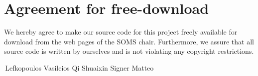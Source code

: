 \section*{Agreement for free-download}
\bigskip

\bigskip

\large We hereby agree to make our source code for this project freely available for download from the web pages of the SOMS chair. Furthermore, we assure that all source code is written by ourselves and is not violating any copyright restrictions.

\begin{center}
	\bigskip
	\bigskip
	
	\,\hfill Lefkopoulos Vasileios \hfill Qi Shuaixin \hfill Signer Matteo \hfill\,
\end{center}

\clearpage